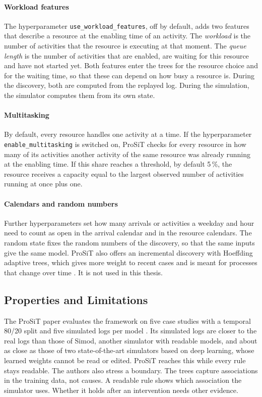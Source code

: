 \paragraph{Workload features}
The hyperparameter \texttt{use\_workload\_features}, off by default, adds two
features that describe a resource at the enabling time of an activity. The
\emph{workload} is the number of activities that the resource is executing at that
moment. The \emph{queue length} is the number of activities that are enabled, are
waiting for this resource and have not started yet. Both features enter the trees
for the resource choice and for the waiting time, so that these can depend on how
busy a resource is. During the discovery, both are computed from the replayed log.
During the simulation, the simulator computes them from its own state.

\paragraph{Multitasking}
By default, every resource handles one activity at a time. If the hyperparameter
\texttt{enable\_multitasking} is switched on, ProSiT checks for every resource in
how many of its activities another activity of the same resource was already
running at the enabling time. If this share reaches a threshold, by default 5\,\%,
the resource receives a capacity equal to the largest observed number of
activities running at once plus one.

\paragraph{Calendars and random numbers}
Further hyperparameters set how many arrivals or activities a weekday and hour
need to count as open in the arrival calendar and in the resource calendars. The
random state fixes the random numbers of the discovery, so that the same inputs
give the same model. ProSiT also offers an incremental discovery with Hoeffding
adaptive trees, which gives more weight to recent cases and is meant for processes
that change over time \cite{ProSiTDocs}. It is not used in this thesis.

\subsection{Properties and Limitations}
\label{sec:prosit_limits}

The ProSiT paper evaluates the framework on five case studies with a temporal
80/20 split and five simulated logs per model \cite{Vinci2026prosit}. Its
simulated logs are closer to the real logs than those of Simod, another simulator
with readable models, and about as close as those of two state-of-the-art
simulators based on deep learning, whose learned weights cannot be read or edited.
ProSiT reaches this while every rule stays readable. The authors also stress a
boundary. The trees capture associations in the training data, not causes. A
readable rule shows which association the simulator uses. Whether it holds after
an intervention needs other evidence.

